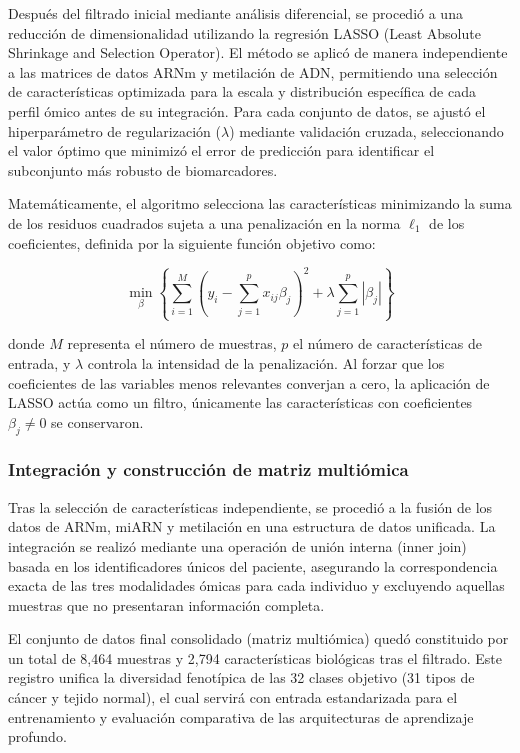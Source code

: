 \documentclass[review,12pt,times,number]{elsarticle}
\begin{document}
Después del filtrado inicial mediante análisis diferencial, se procedió a una reducción de dimensionalidad utilizando la regresión LASSO (Least Absolute Shrinkage and Selection Operator). El método se aplicó de manera independiente a las matrices de datos ARNm y metilación de ADN, permitiendo una selección de características optimizada para la escala y distribución específica de cada perfil ómico antes de su integración. Para cada conjunto de datos, se ajustó el hiperparámetro de regularización ($\lambda$) mediante validación cruzada, seleccionando el valor óptimo que minimizó el error de predicción para identificar el subconjunto más robusto de biomarcadores.

Matemáticamente, el algoritmo selecciona las características minimizando la suma de los residuos cuadrados sujeta a una penalización en la norma $\ell_1$ de los coeficientes, definida por la siguiente función objetivo como:

\begin{equation}
    \min_{\beta} \left\{ \sum_{i=1}^{M} \left(y_i - \sum_{j=1}^{p} x_{ij}\beta_j\right)^2 + \lambda \sum_{j=1}^{p} |\beta_j| \right\}
\end{equation}

donde $M$ representa el número de muestras, $p$ el número de características de entrada, y $\lambda$ controla la intensidad de la penalización. Al forzar que los coeficientes de las variables menos relevantes converjan a cero, la aplicación de LASSO actúa como un filtro, únicamente las características con coeficientes $\beta_j \neq 0$ se conservaron.

\subsubsection{Integración y construcción de matriz multiómica}

Tras la selección de características independiente, se procedió a la fusión de los datos de ARNm, miARN y metilación en una estructura de datos unificada. La integración se realizó mediante una operación de unión interna (inner join) basada en los identificadores únicos del paciente, asegurando la correspondencia exacta de las tres modalidades ómicas para cada individuo y excluyendo aquellas muestras que no presentaran información completa.

El conjunto de datos final consolidado (matriz multiómica) quedó constituido por un total de 8,464 muestras y 2,794 características biológicas tras el filtrado. Este registro unifica la diversidad fenotípica de las 32 clases objetivo (31 tipos de cáncer y tejido normal), el cual servirá con entrada estandarizada para el entrenamiento y evaluación comparativa de las arquitecturas de aprendizaje profundo.
\end{document}
